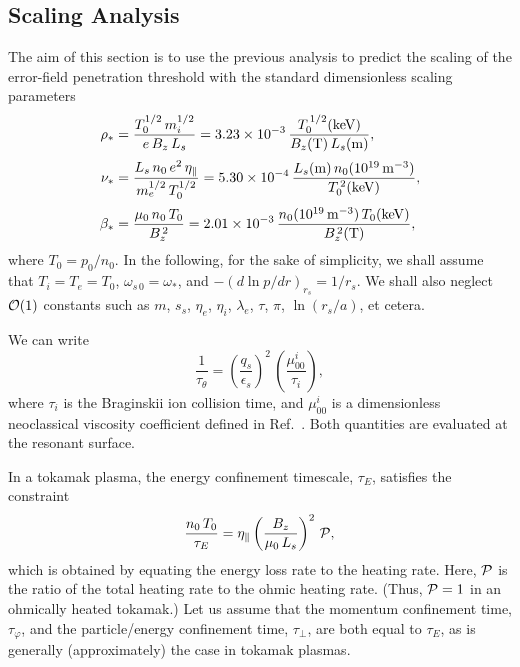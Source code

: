 \documentclass[12pt,prb,aps]{revtex4-1}
\begin{document}
\subsection{Scaling Analysis}
The aim of this section is to use the previous analysis to predict the scaling of the error-field penetration
threshold with the standard dimensionless scaling parameters\,\cite{connor}
\begin{align}
\rho_\ast &= \frac{T_0^{1/2}\,m_i^{1/2}}{e\,B_z\,L_s}= 3.23\times 10^{-3}\,\frac{T_0^{\,1/2}({\rm keV})}{B_z({\rm T})\,L_s({\rm m})},\label{e428}\\[0.5ex]
\nu_\ast &= \frac{L_s\,n_0\,e^2\,\eta_\parallel}{m_e^{1/2}\,T_0^{1/2}}= 5.30\times 10^{-4}\,\frac{L_s({\rm m})\,n_0(10^{19}\,{\rm m}^{-3})}{T_0^{\,2}({\rm keV})},\\[0.5ex]
\beta_\ast&=\frac{\mu_0\,n_0\,T_0}{B_z^{\,2}}= 2.01\times 10^{-3}\,\frac{n_0(10^{19}\,{\rm m}^{-3})\,T_0({\rm keV})}{B_z^{\,2}({\rm T})},\label{e430}
\end{align}
where $T_0=p_0/n_0$. In the following, for the sake of simplicity, we
shall assume that $T_i=T_e=T_0$, $\omega_{s\,0}=\omega_\ast$, and $-(d\ln p/dr)_{r_s} = 1/r_s$. We shall also neglect ${\cal O}(1)$
constants such as $m$, $s_s$, $\eta_e$, $\eta_i$, $\lambda_e$, $\tau$, $\pi$, $\ln(r_s/a)$, et cetera.

We can  write 
\begin{equation}
\frac{1}{\tau_{\theta}} = \left(\frac{q_s}{\epsilon_s}\right)^2\,\left(\frac{\mu_{00}^i}{\tau_{i}}\right),
\end{equation}
 where
$\tau_i$ is the Braginskii ion collision time, and $\mu_{00}^i$ is a dimensionless neoclassical viscosity coefficient defined in Ref.~. Both quantities are evaluated at the resonant surface. 

In a tokamak
plasma, the energy confinement timescale, $\tau_E$, satisfies the constraint
\begin{equation}
\frac{n_0\,T_0}{\tau_E} = \eta_\parallel\left(\frac{B_z}{\mu_0\,L_s}\right)^2\,{\cal P},
\end{equation}
which is obtained by equating the energy loss rate to the heating rate. Here, ${\cal P}$ is the ratio of the total heating rate to the ohmic heating rate. (Thus, ${\cal P}=1$ in an ohmically heated tokamak.)
 Let us assume that the momentum confinement
time, $\tau_\varphi$, and the particle/energy confinement time, $\tau_\perp$, are both equal to $\tau_E$, as is generally
(approximately) the case in  tokamak plasmas.\cite{iter} 
\end{document}
